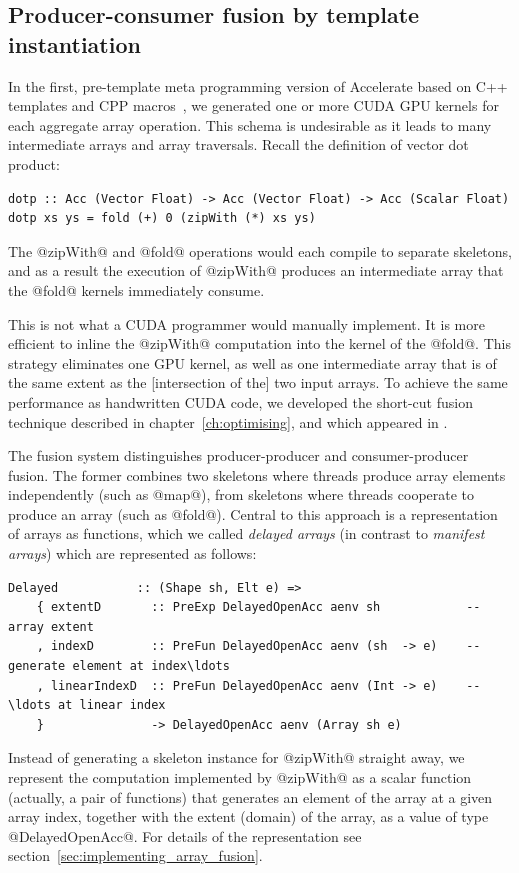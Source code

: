 

\subsection{Producer-consumer fusion by template instantiation}

In the first, pre-template meta programming version of Accelerate based on C++
templates and CPP macros~\cite{Chakravarty:2011fr}, we generated one or more
CUDA GPU kernels for each aggregate array operation. This schema is undesirable
as it leads to many intermediate arrays and array traversals. Recall the
definition of vector dot product:
%
\begin{lstlisting}[style=haskell]
dotp :: Acc (Vector Float) -> Acc (Vector Float) -> Acc (Scalar Float)
dotp xs ys = fold (+) 0 (zipWith (*) xs ys)
\end{lstlisting}
%
The @zipWith@ and @fold@ operations would each compile to separate
skeletons, and as a result the execution of @zipWith@ produces an
intermediate array that the @fold@ kernels immediately consume.

This is not what a CUDA programmer would manually implement. It is more
efficient to inline the @zipWith@ computation into the kernel of the
@fold@. This strategy eliminates one GPU kernel, as well as one
intermediate array that is of the same extent as the [intersection of the] two
input arrays. To achieve the same performance as handwritten CUDA code, we
developed the short-cut fusion technique described in
chapter~\ref{ch:optimising}, and which appeared in \cite{McDonell:2013wi}.

The fusion system distinguishes producer-producer and consumer-producer fusion.
The former combines two skeletons where threads produce array elements
independently (such as @map@), from skeletons where threads cooperate to
produce an array (such as @fold@). Central to this approach is a
representation of arrays as functions, which we called \emph{delayed
arrays} (in contrast to \emph{manifest
arrays}) which are represented as follows:
%
\begin{lstlisting}[style=haskell]
  Delayed           :: (Shape sh, Elt e) =>
    { extentD       :: PreExp DelayedOpenAcc aenv sh            -- array extent
    , indexD        :: PreFun DelayedOpenAcc aenv (sh  -> e)    -- generate element at index\ldots
    , linearIndexD  :: PreFun DelayedOpenAcc aenv (Int -> e)    -- \ldots at linear index
    }               -> DelayedOpenAcc aenv (Array sh e)
\end{lstlisting}
%
Instead of generating a skeleton instance for @zipWith@ straight away, we
represent the computation implemented by @zipWith@ as a scalar function
(actually, a pair of functions) that generates an element of the array at a
given array index, together with the extent (domain) of the array, as a value of
type @DelayedOpenAcc@. For details of the representation see
section~\ref{sec:implementing_array_fusion}.

